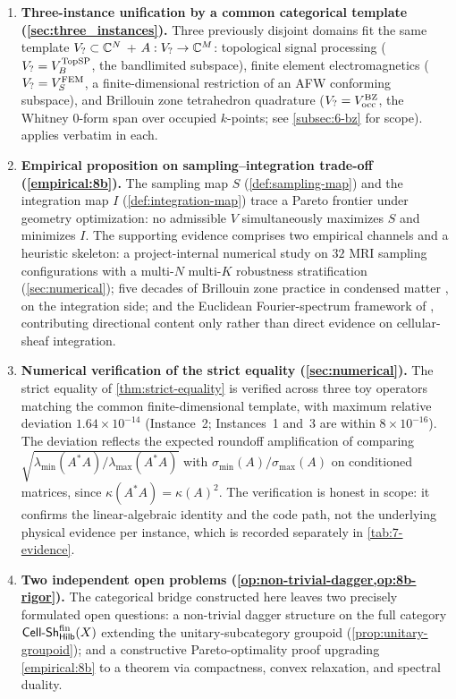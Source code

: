 \begin{enumerate}[leftmargin=*,label=(C\arabic*)]
\item \textbf{Three-instance unification by a common categorical
    template (\cref{sec:three_instances}).} Three previously disjoint
  domains fit the same template
  $V_? \subset \mathbb{C}^N$ + $A : V_? \to \mathbb{C}^M$:
  topological signal processing
  ($V_?  = V_B^{\mathrm{TopSP}}$, the bandlimited subspace),
  finite element electromagnetics
  ($V_?  = V_S^{\mathrm{FEM}}$, a finite-dimensional restriction of an AFW
  conforming subspace), and Brillouin zone tetrahedron quadrature
  ($V_?  = V_{\mathrm{occ}}^{\mathrm{BZ}}$, the Whitney $0$-form span over occupied
  $k$-points; see \cref{subsec:6-bz} for scope).
   applies verbatim in each.

\item \textbf{Empirical proposition on sampling--integration
    trade-off (\cref{empirical:8b}).} The sampling map $S$
  (\cref{def:sampling-map}) and the integration map $I$
  (\cref{def:integration-map}) trace a Pareto frontier under
  geometry optimization: no admissible $V$ simultaneously maximizes
  $S$ and minimizes $I$. The supporting evidence comprises two
  empirical channels and a heuristic skeleton: a project-internal
  numerical study on $32$ MRI sampling configurations with a
  multi-$N$ multi-$K$ robustness stratification (\cref{sec:numerical});
  five decades of Brillouin zone practice in condensed matter
  \cite{Blochl1994,LehmannTaut1972,JepsenAndersen1971,MonkhorstPack1976},
  on the integration side; and the Euclidean Fourier-spectrum
  framework of \cite{Pilleboue2015}, contributing directional
  content only rather than direct evidence on cellular-sheaf
  integration.

\item \textbf{Numerical verification of the strict equality
    (\cref{sec:numerical}).} The strict equality of
  \cref{thm:strict-equality} is verified across three toy operators
  matching the common finite-dimensional template, with maximum
  relative deviation $1.64 \times 10^{-14}$ (Instance~2; Instances~1
  and~3 are within $8 \times 10^{-16}$). The deviation reflects the
  expected roundoff amplification of comparing
  $\sqrt{\lambda_{\min}(A^* A)/\lambda_{\max}(A^* A)}$ with
  $\sigma_{\min}(A)/\sigma_{\max}(A)$ on conditioned matrices, since
  $\kappa(A^* A) = \kappa(A)^2$. The verification is honest in scope:
  it confirms the linear-algebraic identity and the code path, not the
  underlying physical evidence per instance, which is recorded
  separately in \cref{tab:7-evidence}.

\item \textbf{Two independent open problems
    (\cref{op:non-trivial-dagger,op:8b-rigor}).} The categorical
  bridge constructed here leaves two precisely formulated open
  questions: a non-trivial dagger structure on the full category
  $\mathsf{Cell\text{-}Sh}^{\mathrm{fin}}_{\mathsf{Hilb}}(X)$ extending the unitary-subcategory
  groupoid (\cref{prop:unitary-groupoid}); and a constructive
  Pareto-optimality proof upgrading \cref{empirical:8b} to a
  theorem via compactness, convex relaxation, and spectral
  duality.
\end{enumerate}

